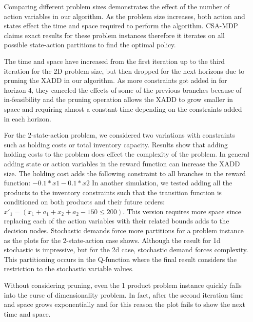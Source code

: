 Comparing different problem sizes demonstrates the effect of the number of action variables in our algorithm. As the problem size increases, both action and states effect the time and space required to perform the algorithm. CSA-MDP claims exact results for these problem instances therefore it iterates on all possible state-action partitions to find the optimal policy. 

The time and space have increased from the first iteration up to the third
iteration for the 2D problem size, but then dropped for the next horizons
due to pruning the XADD in our algorithm. As more constraints got added in
for horizon 4, they canceled the effects of some of the previous branches
because of in-feasibility and the pruning operation allows the XADD to grow
smaller in space and requiring almost a constant time depending on the
constraints added in each horizon.

For the 2-state-action problem, we considered two variations with constraints such as holding costs or total inventory capacity. Results show that adding holding costs to the problem does effect the complexity of the problem. In general adding state or action variables in the reward function can increase the XADD size. The holding cost adds the following constraint to all branches in the reward function: 
$ -0.1*x1 -0.1*x2 $
In another simulation, we tested adding all the products to the inventory constraints such that the transition function is conditioned on both products and their future orders:  $x'_1 = (x_1 + a_1 + x_2 +a_2 - 150 \leq 200) $. This version requires more space since replacing each of the action variables with their related bounds adds to the decision nodes.
Stochastic demands force more partitions for a problem instance as the plots for the 2-state-action case shows. Although the result for 1d stochastic is impressive, but for the 2d case, stochastic demand forces complexity. This partitioning occurs in the Q-function where the final result considers the restriction to the stochastic variable values. 

Without considering pruning, even the 1 product problem instance quickly falls into the curse of dimensionality problem. In fact, after the second iteration time and space grows exponentially and for this reason the plot fails to show the next time and
space.


\subsection{\WaterReservoir}

